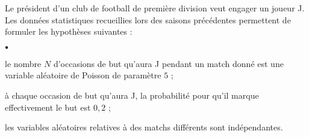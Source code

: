 \documentclass[11pt]{article}%
\begin{document}
Le président d'un club de football de première division veut engager un
joueur J. Les données statistiques
recueillies lors des saisons précédentes permettent de formuler les
hypothèses suivantes :
\begin{noliste}{$\scriptstyle \bullet$}
	\item le nombre $N$ d'occasions de but qu'aura J pendant un match
donné est une variable aléatoire de Poisson
de paramètre $5$ ;
\item à chaque occasion de but qu'aura J, la probabilité pour qu'il
marque effectivement le but est $0{,}2$ ;
\item les variables aléatoires relatives à des matchs différents sont
indépendantes.
\end{noliste}
\end{document}
